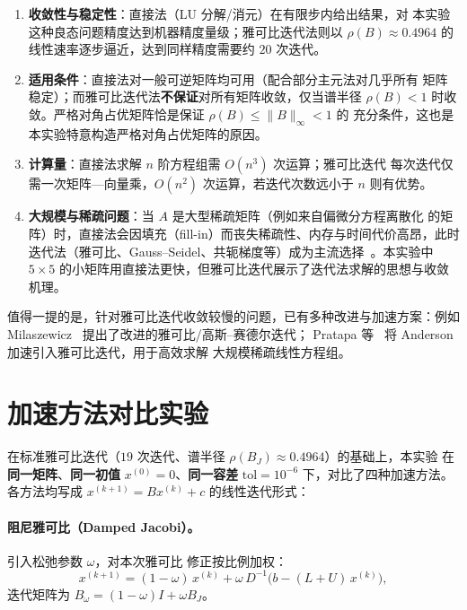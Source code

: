 \documentclass[12pt,a4paper]{ctexart}
\begin{document}
\begin{enumerate}
  \item \textbf{收敛性与稳定性}：直接法（LU 分解/消元）在有限步内给出结果，对
    本实验这种良态问题精度达到机器精度量级；雅可比迭代法则以
    $\rho(B)\approx 0.4964$ 的线性速率逐步逼近，达到同样精度需要约 $20$ 次迭代。
  \item \textbf{适用条件}：直接法对一般可逆矩阵均可用（配合部分主元法对几乎所有
    矩阵稳定）；而雅可比迭代法\textbf{不保证}对所有矩阵收敛，仅当谱半径
    $\rho(B)<1$ 时收敛。严格对角占优矩阵恰是保证 $\rho(B)\le\|B\|_{\infty}<1$ 的
    充分条件，这也是本实验特意构造严格对角占优矩阵的原因。
  \item \textbf{计算量}：直接法求解 $n$ 阶方程组需 $O(n^3)$ 次运算；雅可比迭代
    每次迭代仅需一次矩阵—向量乘，$O(n^2)$ 次运算，若迭代次数远小于 $n$ 则有优势。
  \item \textbf{大规模与稀疏问题}：当 $A$ 是大型稀疏矩阵（例如来自偏微分方程离散化
    的矩阵）时，直接法会因填充（fill-in）而丧失稀疏性、内存与时间代价高昂，此时
    迭代法（雅可比、Gauss--Seidel、共轭梯度等）成为主流选择~\cite{saad2003}。本实验中 $5\times 5$
    的小矩阵用直接法更快，但雅可比迭代展示了迭代法求解的思想与收敛机理。
\end{enumerate}

值得一提的是，针对雅可比迭代收敛较慢的问题，已有多种改进与加速方案：例如
Milaszewicz~\cite{milaszewicz1987} 提出了改进的雅可比/高斯--赛德尔迭代；
Pratapa 等~\cite{pratapa2015} 将 Anderson 加速引入雅可比迭代，用于高效求解
大规模稀疏线性方程组。

\section{加速方法对比实验}

在标准雅可比迭代（$19$ 次迭代、谱半径 $\rho(B_J)\approx0.4964$）的基础上，本实验
在\textbf{同一矩阵}、\textbf{同一初值} $x^{(0)}=0$、\textbf{同一容差}
$\mathrm{tol}=10^{-6}$ 下，对比了四种加速方法。各方法均写成
$x^{(k+1)}=B x^{(k)}+c$ 的线性迭代形式：

\paragraph{阻尼雅可比（Damped Jacobi）。}引入松弛参数 $\omega$，对本次雅可比
修正按比例加权：
\begin{equation}
  x^{(k+1)} = (1-\omega)\,x^{(k)} + \omega\, D^{-1}\bigl(b-(L+U)\,x^{(k)}\bigr),
\end{equation}
迭代矩阵为 $B_{\omega} = (1-\omega)I + \omega B_J$。
\end{document}
